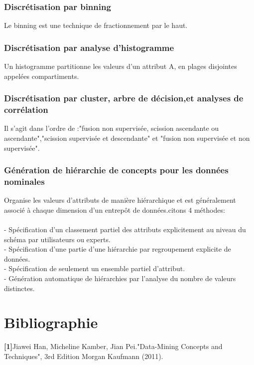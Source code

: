 \documentclass[12pt,a4paper,oneside]{book}
\begin{document}
\subsection{Discrétisation par binning}
Le binning est une technique de fractionnement par le haut.

\subsection{Discrétisation par analyse d'histogramme}
Un histogramme partitionne les valeurs d'un attribut A, en plages disjointes appelées compartiments.

\subsection{Discrétisation par cluster, arbre de décision,et analyses de corrélation}
Il s'agit dans l'ordre de :"fusion non supervisée, scission ascendante ou ascendante","scission supervisée et descendante" et "fusion non supervisée et non supervisée".

\subsection{Génération de hiérarchie de concepts pour les données nominales}
Organise les valeurs d'attributs de manière hiérarchique et est généralement associé à chaque dimension d'un entrepôt de données.citons 4 méthodes:\\
\textbf{ }\\
	- Spécification d'un classement partiel des attributs explicitement au niveau du schéma par	utilisateurs ou experts.\\
	- Spécification d'une partie d'une hiérarchie par regroupement explicite de données.\\
	- Spécification de seulement un ensemble partiel d'attribut.\\
	- Génération automatique de hiérarchies par l'analyse du nombre de valeurs distinctes.


\chapter*{Bibliographie}

 \textbf{[1]}Jiawei Han, Micheline Kamber, Jian Pei."Data-Mining Concepts and Techniques", 3rd Edition Morgan Kaufmann (2011).\\
\end{document}
